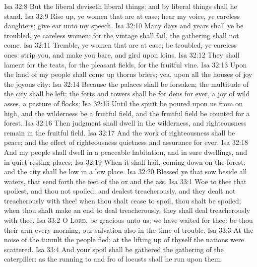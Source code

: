 \vs Isa 32:8 But the liberal deviseth liberal things; and by liberal things shall he stand.
\vs Isa 32:9 Rise up, ye women that are at ease; hear my voice, ye careless daughters; give ear unto my speech.
\vs Isa 32:10 Many days and years shall ye be troubled, ye careless women: for the vintage shall fail, the gathering shall not come.
\vs Isa 32:11 Tremble, ye women that are at ease; be troubled, ye careless ones: strip you, and make you bare, and gird  upon  loins.
\vs Isa 32:12 They shall lament for the teats, for the pleasant fields, for the fruitful vine.
\vs Isa 32:13 Upon the land of my people shall come up thorns  briers; yea, upon all the houses of joy  the joyous city:
\vs Isa 32:14 Because the palaces shall be forsaken; the multitude of the city shall be left; the forts and towers shall be for dens for ever, a joy of wild asses, a pasture of flocks;
\vs Isa 32:15 Until the spirit be poured upon us from on high, and the wilderness be a fruitful field, and the fruitful field be counted for a forest.
\vs Isa 32:16 Then judgment shall dwell in the wilderness, and righteousness remain in the fruitful field.
\vs Isa 32:17 And the work of righteousness shall be peace; and the effect of righteousness quietness and assurance for ever.
\vs Isa 32:18 And my people shall dwell in a peaceable habitation, and in sure dwellings, and in quiet resting places;
\vs Isa 32:19 When it shall hail, coming down on the forest; and the city shall be low in a low place.
\vs Isa 32:20 Blessed  ye that sow beside all waters, that send forth  the feet of the ox and the ass.
\vs Isa 33:1 Woe to thee that spoilest, and thou  not spoiled; and dealest treacherously, and they dealt not treacherously with thee! when thou shalt cease to spoil, thou shalt be spoiled;  when thou shalt make an end to deal treacherously, they shall deal treacherously with thee.
\vs Isa 33:2 O \textsc{Lord}, be gracious unto us; we have waited for thee: be thou their arm every morning, our salvation also in the time of trouble.
\vs Isa 33:3 At the noise of the tumult the people fled; at the lifting up of thyself the nations were scattered.
\vs Isa 33:4 And your spoil shall be gathered  the gathering of the caterpiller: as the running to and fro of locusts shall he run upon them.
